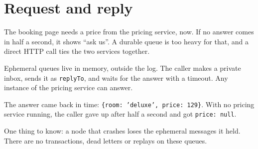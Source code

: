 %

\section{Request and reply}

The booking page needs a price from the pricing service, now. If no answer comes in half a second,
it shows ``ask us''. A durable queue is too heavy for that, and a direct HTTP call ties the two
services together.

Ephemeral queues live in memory, outside the log. The caller makes a private inbox, sends it as
\texttt{replyTo}, and waits for the answer with a timeout. Any instance of the pricing service can
answer.



The answer came back in time: \texttt{\{room: 'deluxe', price: 129\}}. With no pricing service
running, the caller gave up after half a second and got \texttt{price: null}.


One thing to know: a node that crashes loses the ephemeral messages it held. There are no
transactions, dead letters or replays on these queues.
